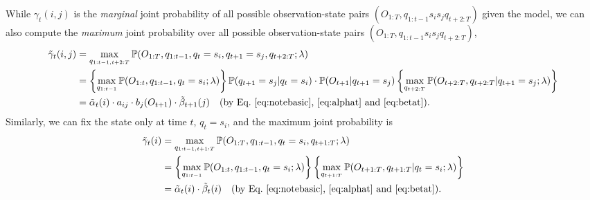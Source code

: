 While $\gamma_t(i,j)$ is the \emph{marginal} joint probability of all possible observation-state pairs 
$(O_{1:T}, q_{1:t-1} s_i s_j q_{t+2:T})$ given the model,
we can also compute the \emph{maximum} joint probability over all possible observation-state pairs $(O_{1:T}, q_{1:t-1} s_i s_j q_{t+2:T})$, \ie
\begin{equation}
\label{eq:gammat}
\begin{aligned}
\tilde{\gamma}_t(i,j) 
&= \max_{q_{1:t-1,t+2:T}} \mathbb{P}(O_{1:T}, q_{1:t-1}, q_t = s_i, q_{t+1} = s_j, q_{t+2:T} ;\lambda) \\
&= \left\{ \max_{q_{1:t-1}} \mathbb{P}(O_{1:t}, q_{1:t-1}, q_t = s_i ;\lambda) \right\} \mathbb{P}(q_{t+1} = s_j |q_t = s_i) \cdot \mathbb{P}(O_{t+1} |q_{t+1} = s_j) 
   \left\{ \max_{q_{t+2:T}} \mathbb{P}(O_{t+2:T}, q_{t+2:T} |q_{t+1} = s_j; \lambda) \right\} \\
&= \tilde{\alpha}_t(i) \cdot a_{ij} \cdot b_j(O_{t+1}) \cdot \tilde{\beta}_{t+1}(j) 
   ~~~ \text{(by Eq.~\ref{eq:notebasic}, \ref{eq:alphat} and \ref{eq:betat})}.
\end{aligned}
\end{equation}
Similarly, we can fix the state only at time $t$, \ie $q_t = s_i$, 
and the maximum joint probability is
\begin{equation}
\label{eq:gammat0}
\begin{aligned}
\tilde{\gamma}_t(i) 
&= \max_{q_{1:t-1,t+1:T}} \mathbb{P}(O_{1:T}, q_{1:t-1}, q_t = s_i, q_{t+1:T} ;\lambda) \\
&= \left\{ \max_{q_{1:t-1}} \mathbb{P}(O_{1:t}, q_{1:t-1}, q_t = s_i ;\lambda) \right\}  
   \left\{ \max_{q_{t+1:T}} \mathbb{P}(O_{t+1:T}, q_{t+1:T} |q_t = s_i; \lambda) \right\} \\
&= \tilde{\alpha}_t(i) \cdot \tilde{\beta}_t(i) 
   ~~~ \text{(by Eq.~\ref{eq:notebasic}, \ref{eq:alphat} and \ref{eq:betat})}.
\end{aligned}
\end{equation}

